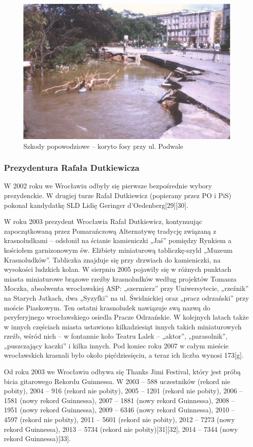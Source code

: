 \documentclass{article}
\begin{document}
\begin{figure}[h!]
\centering
\includegraphics[scale=3]{Powodz_wr.jpg}
\caption{Szkody popowodziowe – koryto fosy przy ul. Podwale}
\label{fig:powodz}
\end{figure}
\subsubsection{Prezydentura Rafała Dutkiewicza}
W 2002 roku we Wrocławiu odbyły się pierwsze bezpośrednie wybory prezydenckie. W drugiej turze Rafał Dutkiewicz (popierany przez PO i PiS) pokonał kandydatkę SLD Lidię Geringer d’Oedenberg[29][30].

W roku 2003 prezydent Wrocławia Rafał Dutkiewicz, kontynuując zapoczątkowaną przez Pomarańczową Alternatywę tradycję związaną z krasnoludkami – odsłonił na ścianie kamieniczki „Jaś” pomiędzy Rynkiem a kościołem garnizonowym św. Elżbiety miniaturową tabliczkę-szyld „Muzeum Krasnoludków”. Tabliczka znajduje się przy drzwiach do kamieniczki, na wysokości ludzkich kolan. W sierpniu 2005 pojawiły się w różnych punktach miasta miniaturowe brązowe rzeźby krasnoludków według projektów Tomasza Moczka, absolwenta wrocławskiej ASP: „szermierz” przy Uniwersytecie, „rzeźnik” na Starych Jatkach, dwa „Syzyfki” na ul. Świdnickiej oraz „pracz odrzański” przy moście Piaskowym. Ten ostatni krasnoludek nawiązuje swą nazwą do peryferyjnego wrocławskiego osiedla Pracze Odrzańskie. W kolejnych latach także w innych częściach miasta ustawiono kilkadziesiąt innych takich miniaturowych rzeźb, wśród nich – w fontannie koło Teatru Lalek – „aktor”, „parasolnik”, „puszczający kaczki” i kilka innych. Pod koniec roku 2007 w całym mieście wrocławskich krasnali było około pięćdziesięciu, a teraz ich liczba wynosi 173[g].

Od roku 2003 we Wrocławiu odbywa się Thanks Jimi Festival, który jest próbą bicia gitarowego Rekordu Guinnessa. W 2003 – 588 uczestników (rekord nie pobity), 2004 – 916 (rekord nie pobity), 2005 – 1201 (rekord nie pobity), 2006 – 1581 (nowy rekord Guinnessa), 2007 – 1881 (nowy rekord Guinnessa), 2008 – 1951 (nowy rekord Guinnessa), 2009 – 6346 (nowy rekord Guinnessa), 2010 – 4597 (rekord nie pobity), 2011 – 5601 (rekord nie pobity), 2012 – 7273 (nowy rekord Guinnessa), 2013 – 5734 (rekord nie pobity)[31][32], 2014 – 7344 (nowy rekord Guinnessa)[33].
\end{document}
